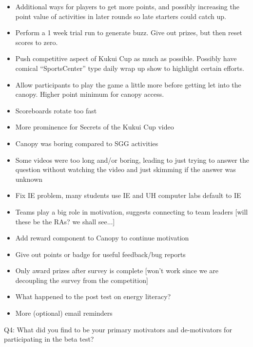 \begin{itemize}
  \item Additional ways for players to get more points, and possibly increasing the point value of activities in later rounds so late starters could catch up.
  \item Perform a 1 week trial run to generate buzz. Give out prizes, but then reset scores to zero.
  \item Push competitive aspect of Kukui Cup as much as possible. Possibly have comical ``SportsCenter'' type daily wrap up show to highlight certain efforts.
  \item Allow participants to play the game a little more before getting let into the canopy. Higher point minimum for canopy access. 
  \item Scoreboards rotate too fast
  \item More prominence for Secrets of the Kukui Cup video
  \item Canopy was boring compared to SGG activities
  \item Some videos were too long and/or boring, leading to just trying to answer the question without watching the video and just skimming if the answer was unknown
  \item Fix IE problem, many students use IE and UH computer labs default to IE
  \item Teams play a big role in motivation, suggests connecting to team leaders [will these be the RAs? we shall see...]
  \item Add reward component to Canopy to continue motivation
  \item Give out points or badge for useful feedback/bug reports
  \item Only award prizes after survey is complete [won't work since we are decoupling the survey from the competition]
  \item What happened to the post test on energy literacy?
  \item More (optional) email reminders
\end{itemize}

Q4: What did you find to be your primary motivators and de-motivators for participating in the beta test?

